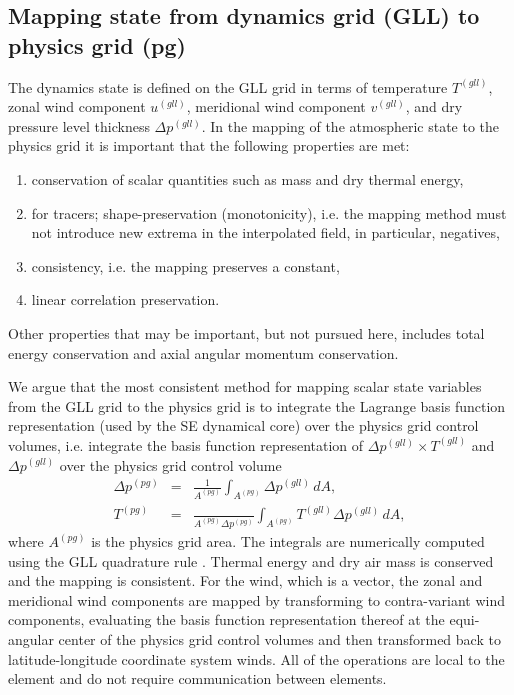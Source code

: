 \documentclass[twocol]{ametsoc}
\begin{document}
\subsection{Mapping state from dynamics grid (GLL) to physics grid (pg)}
The dynamics state is defined on the GLL grid in terms of temperature $T^{(gll)}$, zonal wind component $u^{(gll)}$, meridional wind component $v^{(gll)}$, and dry pressure level thickness $\Delta p^{(gll)}$. In the mapping of the atmospheric state to the physics grid it is important that the following properties are met:
\begin{enumerate}
\item conservation of scalar quantities such as mass and dry thermal energy,\label{prop1}
\item for tracers; shape-preservation (monotonicity), i.e. the mapping method must not introduce new extrema in the interpolated field, in particular, negatives,\label{prop2}
\item consistency, i.e. the mapping preserves a constant,\label{prop3}
\item linear correlation preservation.
\end{enumerate}
Other properties that may be important, but not pursued here, includes total energy conservation and axial angular momentum conservation{}. 

We argue that the most consistent method for mapping scalar state variables from the GLL grid to the physics grid is to integrate the Lagrange basis function representation (used by the SE dynamical core) over the physics grid control volumes, i.e. integrate the basis function representation of $\Delta p^{(gll)}\times T^{(gll)}$ and $\Delta p^{(gll)}$ over the physics grid control volume \citep[see, e.g., ][]{LTOUNGK2017MWR,UT2015MWR}
\begin{eqnarray}
\Delta p^{(pg)}&=&\frac{1}{A^{(pg)}}\int_{A^{(pg)}}\Delta p^{(gll)}\, dA,\\
T^{(pg)}&=&\frac{}{A^{(pg)}\Delta p^{(pg)}}\int_{A^{(pg)}}T^{(gll)}\Delta p^{(gll)}\, dA,
\end{eqnarray}
where $A^{(pg)}$ is the physics grid area. The integrals are numerically computed using the GLL quadrature rule {}. Thermal energy and dry air mass is conserved and the mapping is consistent. For the wind, which is a vector, the zonal and meridional wind components are mapped by transforming to contra-variant wind components, evaluating the basis function representation thereof at the equi-angular center of the physics grid control volumes and then transform{\color{red}ed{}} back to latitude-longitude coordinate system winds. All of the operations are local to the element and do not require communication between elements.
\end{document}
